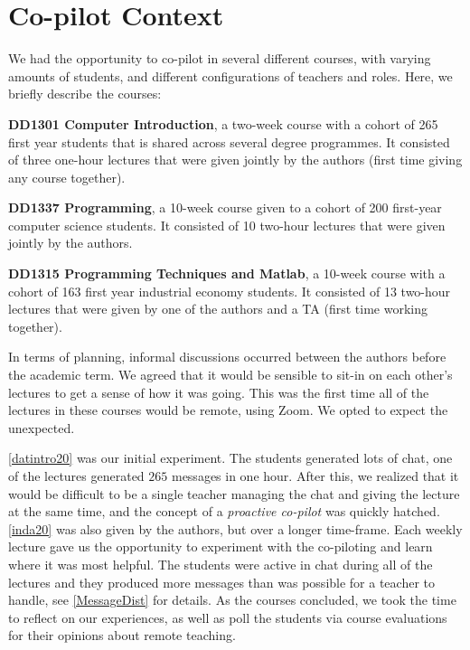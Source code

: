 \documentclass[sigconf,natbib=false]{acmart}
\begin{document}
\section{Co-pilot Context}
We had the opportunity to co-pilot in several different courses, with varying amounts of students, and different configurations of teachers and roles. Here, we briefly describe the courses:

\begin{courses}
  \item\label{datintro20} \textbf{DD1301 Computer Introduction}, a two-week 
    course with a cohort of 265 first year students that is shared across 
    several degree programmes. It consisted of three one-hour lectures that 
    were given jointly by the authors (first time giving any course together).

  \item\label{inda20} \textbf{DD1337 Programming}, a 10-week course given to a 
    cohort of 200 first-year computer science students. It consisted of 10 
    two-hour lectures that were given jointly by the authors.

  \item\label{prgi20} \textbf{DD1315 Programming Techniques and Matlab}, a 
    10-week course with a cohort of 163 first year industrial economy students. 
    It consisted of 13 two-hour lectures that were given by one of the authors 
    and a \ac{TA} (first time working together).
\end{courses}

In terms of planning, informal discussions occurred between the authors before 
the academic term. We agreed that it would be sensible to sit-in on each 
other's lectures to get a sense of how it was going. This was the first time 
all of the lectures in these courses would be remote, using Zoom. We opted to 
expect the unexpected.

\ref{datintro20} was our initial experiment. The students generated lots of 
chat, \eg one of the lectures generated $265$ messages in one hour. After this, 
we realized that it would be difficult to be a single teacher managing the chat 
and giving the lecture at the same time, and the concept of a \emph{proactive 
co-pilot} was quickly hatched. \ref{inda20} was also given by the authors, but 
over a longer time-frame. Each weekly lecture gave us the opportunity to 
experiment with the co-piloting and learn where it was most helpful. The 
students were active in chat during all of the lectures and they produced more 
messages than was possible for a teacher to handle, see \cref{MessageDist} 
for details. As the courses concluded, we took the time to reflect on our 
experiences, as well as poll the students via course evaluations for their 
opinions about remote teaching.
\end{document}
